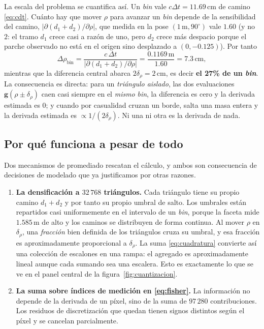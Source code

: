 \documentclass[11pt,a4paper]{article}
\newcommand{\vect}[1]{\boldsymbol{#1}}
\theoremstyle{definition}
\theoremstyle{plain}
\begin{document}
La escala del problema se cuantifica así. Un \emph{bin} vale
$c\Delta t = 11.69\,$cm de camino \eqref{eq:cdt}. Cuánto hay que mover $\rho$
para avanzar un \emph{bin} depende de la sensibilidad del camino,
$|\partial(d_1+d_2)/\partial\rho|$, que medida en la pose
$(1\,\text{m},90^\circ)$ vale $1.60$ (y no $2$: el tramo $d_1$ crece casi a
razón de uno, pero $d_2$ crece más despacio porque el parche observado no está
en el origen sino desplazado a $(0,-0.125)$). Por tanto
%
\begin{equation}
\label{eq:paso-bin}
\Delta\rho_{\text{bin}}
= \frac{c\,\Delta t}{|\partial(d_1+d_2)/\partial\rho|}
= \frac{0.1169\,\text{m}}{1.60} = 7.3\,\text{cm} ,
\end{equation}
%
mientras que la diferencia central abarca $2\delta_\rho = 2\,$cm, es decir
\textbf{el 27\% de un \emph{bin}}. La consecuencia es directa: para
un \emph{triángulo aislado}, las dos evaluaciones $\vect g(\rho\pm\delta_\rho)$
caen casi siempre en el \emph{mismo} \emph{bin}, la diferencia es cero y la
derivada estimada es $0$; y cuando por casualidad cruzan un borde, salta una
masa entera y la derivada estimada es $\propto1/(2\delta_\rho)$. Ni una ni otra
es la derivada de nada.

\subsection{Por qué funciona a pesar de todo}

Dos mecanismos de promediado rescatan el cálculo, y ambos son consecuencia de
decisiones de modelado que ya justificamos por otras razones.

\begin{enumerate}[leftmargin=*]
  \item \textbf{La densificación a $32\,768$ triángulos.} Cada triángulo tiene
        su propio camino $d_1+d_2$ y por tanto su propio umbral de salto. Los
        umbrales están repartidos casi uniformemente en el intervalo de un
        \emph{bin}, porque la faceta mide $1.585\,$m de alto y los caminos se
        distribuyen de forma continua. Al mover $\rho$ en $\delta_\rho$, una
        \emph{fracción} bien definida de los triángulos cruza su umbral, y esa
        fracción es aproximadamente proporcional a $\delta_\rho$. La suma
        \eqref{eq:cuadratura} convierte así una colección de escalones en una
        rampa: el agregado es aproximadamente lineal aunque cada sumando sea una
        escalera. Esto es exactamente lo que se ve en el panel central de la
        figura~\ref{fig:cuantizacion}.
  \item \textbf{La suma sobre índices de medición en \eqref{eq:fisher}.} La
        información no depende de la derivada de un píxel, sino de la suma de
        $97\,280$ contribuciones. Los residuos de discretización que quedan
        tienen signos distintos según el píxel y se cancelan parcialmente.
\end{enumerate}
\end{document}
